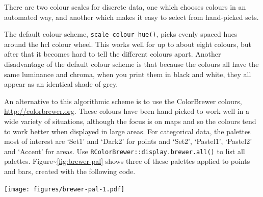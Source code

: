 There are two colour scales for discrete data, one which chooses colours
in an automated way, and another which makes it easy to select from
hand-picked sets.

The default colour scheme, \texttt{scale\_colour\_hue()}, picks evenly
spaced hues around the hcl colour wheel. This works well for up to about
eight colours, but after that it becomes hard to tell the different
colours apart. Another disadvantage of the default colour scheme is that
because the colours all have the same luminance and chroma, when you
print them in black and white, they all appear as an identical shade of
grey.  

An alternative to this algorithmic scheme is to use the ColorBrewer
colours, \url{http://colorbrewer.org}. These colours have been hand
picked to work well in a wide variety of situations, although the focus
is on maps and so the colours tend to work better when displayed in
large areas. For categorical data, the palettes most of interest are
`Set1' and `Dark2' for points and `Set2', `Pastel1', `Pastel2' and
`Accent' for areas. Use \texttt{RColorBrewer::display.brewer.all()} to
list all palettes. Figure\textasciitilde{}\ref{fig:brewer-pal} shows
three of these palettes applied to points and bars, created with the
following code.  

\begin{Shaded}
\begin{Highlighting}[]
\StringTok{ }  \NormalTok{, }
   
\StringTok{ }\NormalTok{(}  
   \NormalTok{)}

\StringTok{ }\NormalTok{(} \NormalTok{)}
\end{Highlighting}
\end{Shaded}

\texttt{[image: figures/brewer-pal-1.pdf]}

\begin{Shaded}
\begin{Highlighting}[]
\StringTok{ }\NormalTok{(} \NormalTok{)  }
\end{Highlighting}
\end{Shaded}

